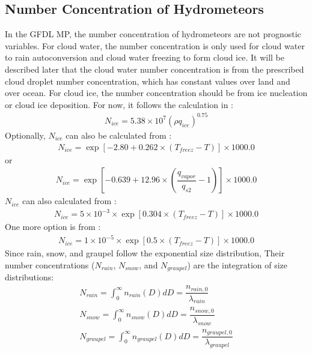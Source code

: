 \documentclass[letterpaper,titlepage,10pt]{article}
\numberwithin{equation}{section}
\begin{document}

\subsection{Number Concentration of Hydrometeors}

In the GFDL MP, the number concentration of hydrometeors are not prognostic variables. For cloud water, the number concentration is only used for cloud water to rain autoconversion and cloud water freezing to form cloud ice. It will be described later that the cloud water number concentration is from the prescribed cloud droplet number concentration, which has constant values over land and over ocean. For cloud ice, the number concentration should be from ice nucleation or cloud ice deposition. For now, it follows the calculation in \citet{hong2004arev}:
\begin{gather}
	N_{ice} = 5.38 \times 10^7 \left(\rho q_{ice} \right)^{0.75}
\end{gather}
Optionally, $N_{ice}$ can also be calculated from \citet{meyers1992newp}:
\begin{gather}
	N_{ice} = \exp \left[-2.80 + 0.262 \times \left(T_{freez} - T \right) \right] \times 1000.0
\end{gather}
or
\begin{gather}
	N_{ice} = \exp \left[-0.639 + 12.96 \times \left(\dfrac{q_{vapor}}{q_{s2}} - 1 \right) \right] \times 1000.0
\end{gather}
$N_{ice}$ can also calculated from \citet{cooper1986icei}:
\begin{gather}
	N_{ice} = 5 \times 10^{-3} \times \exp \left[0.304 \times \left(T_{freez} - T \right) \right] \times 1000.0
\end{gather}
One more option is from \citet{fletcher1962thep}:
\begin{gather}
	N_{ice} = 1 \times 10^{-5} \times \exp \left[0.5 \times \left(T_{freez} - T \right) \right] \times 1000.0
\end{gather}
Since rain, snow, and graupel follow the exponential size distribution, Their number concentrations ($N_{rain}$, $N_{snow}$, and $N_{graupel}$) are the integration of size distributions:
\begin{gather}
	N_{rain} = \int_0^{\infty} n_{rain} (D) dD = \dfrac{n_{rain,0}}{\lambda_{rain}} \\
	N_{snow} = \int_0^{\infty} n_{snow} (D) dD = \dfrac{n_{snow,0}}{\lambda_{snow}} \\
	N_{graupel} = \int_0^{\infty} n_{graupel} (D) dD = \dfrac{n_{graupel,0}}{\lambda_{graupel}}
\end{gather}
\end{document}
